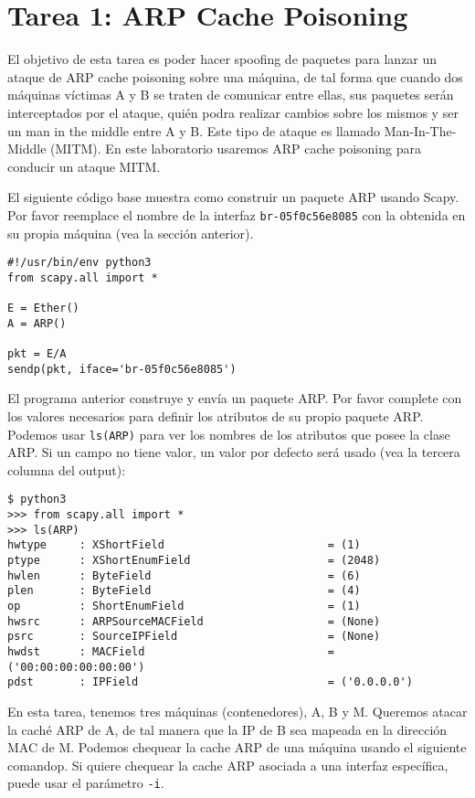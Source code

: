 \section{Tarea 1: ARP Cache Poisoning}

El objetivo de esta tarea es poder hacer spoofing de paquetes para lanzar un ataque de ARP cache poisoning sobre una máquina, de tal forma que cuando dos máquinas víctimas A y B se traten de comunicar entre ellas, sus paquetes serán interceptados por el ataque, quién podra realizar cambios sobre los mismos y ser un man in the middle entre A y B. Este tipo de ataque es llamado Man-In-The-Middle (MITM).
En este laboratorio usaremos ARP cache poisoning para conducir un ataque MITM.

El siguiente código base muestra como construir un paquete ARP usando Scapy.
Por favor reemplace el nombre de la interfaz \texttt{br-05f0c56e8085} con la obtenida en su propia máquina (vea la sección anterior).

\begin{lstlisting}
#!/usr/bin/env python3
from scapy.all import *

E = Ether()
A = ARP()

pkt = E/A
sendp(pkt, iface='br-05f0c56e8085')
\end{lstlisting}

El programa anterior construye y envía un paquete ARP. Por favor complete con los valores necesarios para definir los atributos de su propio paquete ARP. Podemos usar \texttt{ls(ARP)} para ver los nombres de los atributos que posee la clase ARP. Si un campo no tiene valor, un valor por defecto será usado (vea la tercera columna del output):


\begin{lstlisting}
$ python3
>>> from scapy.all import *
>>> ls(ARP)
hwtype     : XShortField                         = (1)
ptype      : XShortEnumField                     = (2048)
hwlen      : ByteField                           = (6)
plen       : ByteField                           = (4)
op         : ShortEnumField                      = (1)
hwsrc      : ARPSourceMACField                   = (None)
psrc       : SourceIPField                       = (None)
hwdst      : MACField                            = ('00:00:00:00:00:00')
pdst       : IPField                             = ('0.0.0.0')
\end{lstlisting}

En esta tarea, tenemos tres máquinas (contenedores), A, B y M.
Queremos atacar la caché ARP de A, de tal manera que la IP de B sea mapeada en la dirección MAC de M. Podemos chequear la cache ARP de una máquina usando el siguiente comandop. Si quiere chequear la cache ARP asociada a una interfaz específica, puede usar el parámetro \texttt{-i}.

